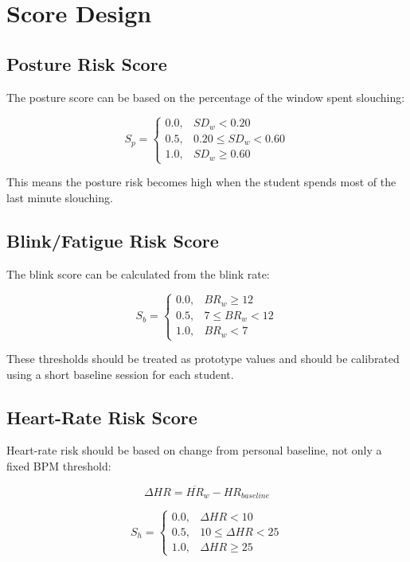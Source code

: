 \documentclass[11pt,a4paper]{article}
\begin{document}
\section{Score Design}

\subsection{Posture Risk Score}
The posture score can be based on the percentage of the window spent slouching:

\begin{equation}
S_p =
\begin{cases}
0.0, & SD_w < 0.20 \\
0.5, & 0.20 \leq SD_w < 0.60 \\
1.0, & SD_w \geq 0.60
\end{cases}
\end{equation}

This means the posture risk becomes high when the student spends most of the last minute slouching.

\subsection{Blink/Fatigue Risk Score}
The blink score can be calculated from the blink rate:

\begin{equation}
S_b =
\begin{cases}
0.0, & BR_w \geq 12 \\
0.5, & 7 \leq BR_w < 12 \\
1.0, & BR_w < 7
\end{cases}
\end{equation}

These thresholds should be treated as prototype values and should be calibrated using a short baseline session for each student.

\subsection{Heart-Rate Risk Score}
Heart-rate risk should be based on change from personal baseline, not only a fixed BPM threshold:

\begin{equation}
\Delta HR = \overline{HR}_w - HR_{baseline}
\end{equation}

\begin{equation}
S_h =
\begin{cases}
0.0, & \Delta HR < 10 \\
0.5, & 10 \leq \Delta HR < 25 \\
1.0, & \Delta HR \geq 25
\end{cases}
\end{equation}
\end{document}
